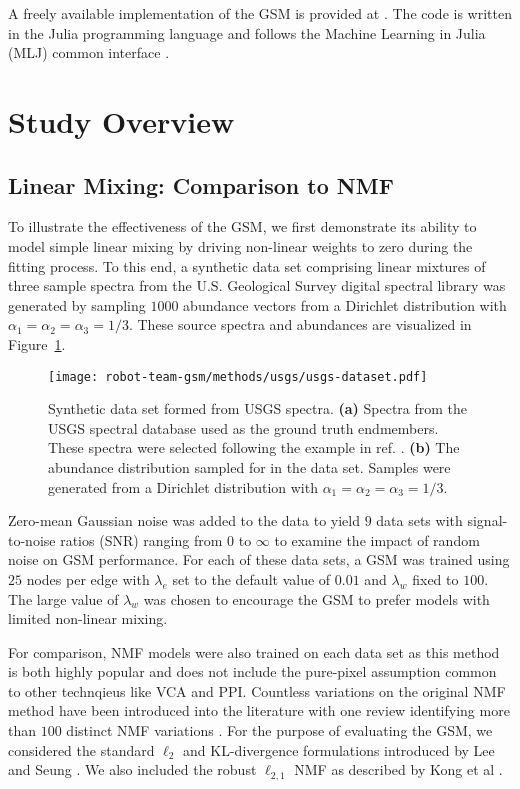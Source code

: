 A freely available implementation of the GSM is provided at \cite{gtm-code}. The
code is written in the Julia programming language and follows the Machine
Learning in Julia (MLJ) common interface \cite{bezanson2012julia, blaom2020mlj}.


\section{Study Overview}

\subsection{Linear Mixing: Comparison to NMF}

To illustrate the effectiveness of the GSM, we first demonstrate its ability to
model simple linear mixing by driving non-linear weights to zero during the
fitting process. To this end, a synthetic data set comprising linear mixtures of
three sample spectra from the U.S. Geological Survey digital spectral library
\cite{usgs-spectra} was generated by sampling $1000$ abundance vectors from a
Dirichlet distribution with $\alpha_1=\alpha_2=\alpha_3=1/3$. These source
spectra and abundances are visualized in Figure~\ref{fig:usgs-data}.

\begin{figure}[H]
  \centering
  \texttt{[image: robot-team-gsm/methods/usgs/usgs-dataset.pdf]}
  \caption{Synthetic data set formed from USGS spectra. \textbf{(a)} Spectra
    from the USGS spectral database used as the ground truth endmembers. These
    spectra were selected following the example in ref. \cite{vca-orig}.
    \textbf{(b)} The abundance distribution sampled for in the data set. Samples
    were generated from a Dirichlet distribution with
    $\alpha_1=\alpha_2=\alpha_3=1/3$.}
  \label{fig:usgs-data}
\end{figure}

Zero-mean Gaussian noise was added to the data to yield $9$ data sets with
signal-to-noise ratios (SNR) ranging from $0$ to $\infty$ to examine the impact
of random noise on GSM performance. For each of these data sets, a GSM was
trained using $25$ nodes per edge with $\lambda_e$ set to the default value of
$0.01$ and $\lambda_w$ fixed to $100$. The large value of $\lambda_w$ was chosen
to encourage the GSM to prefer models with limited non-linear mixing.


For comparison, NMF models were also trained on each data set as this method is
both highly popular and does not include the pure-pixel assumption common to
other technqieus like VCA and PPI. Countless variations on the original NMF
method have been introduced into the literature with one review identifying more
than $100$ distinct NMF variations \cite{unmixing-nmf-review}. For the purpose
of evaluating the GSM, we considered the standard $\ell_2$ and KL-divergence
formulations introduced by Lee and Seung \cite{nmf-algorithms}. We also included
the robust $\ell_{2,1}$ NMF as described by Kong et al \cite{nmf-l21}.


